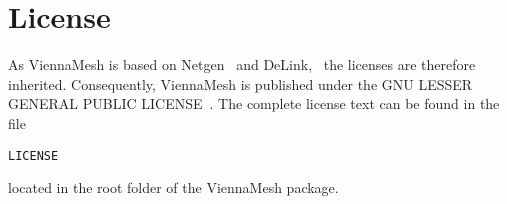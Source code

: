 
\section{License} %

As ViennaMesh is based on Netgen~\cite{netgen} and DeLink,~\cite{delink} the licenses are therefore 
inherited. Consequently, ViennaMesh is published under the 
GNU LESSER GENERAL PUBLIC LICENSE~\cite{lgpl}. The complete license text can be found 
in the file 

\begin{exaipd}
\begin{Verbatim}
LICENSE
\end{Verbatim}
\end{exaipd}

located in the root folder of the ViennaMesh package.




